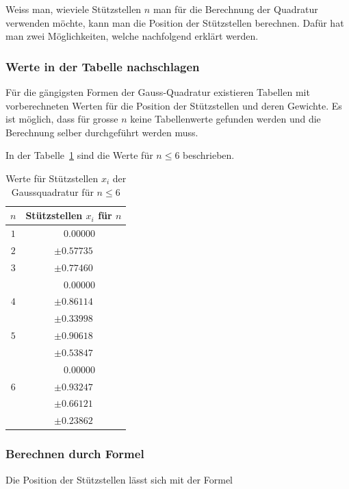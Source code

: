 Weiss man, wieviele Stützstellen $n$ man für die Berechnung der Quadratur verwenden möchte,
kann man die Position der Stützstellen berechnen. 
Dafür hat man zwei Möglichkeiten, welche nachfolgend erklärt werden.

\newpage

\subsubsection{Werte in der Tabelle nachschlagen}
Für die gängigsten Formen der Gauss-Quadratur existieren Tabellen mit vorberechneten Werten für die
Position der Stützstellen und deren Gewichte. 
Es ist möglich, dass für grosse $n$ keine Tabellenwerte gefunden werden und die Berechnung 
selber durchgeführt werden muss.

In der Tabelle~\ref{buch:table:gaussabscissenwerte} sind die Werte für $n \leq 6$ beschrieben.

\begin{table}[h!]
    \centering
    \begin{tabular}{|c|c|}
        \hline
        $n$ & Stützstellen $x_{i}$ für $n$ \\
        \hline
        $1$ & $ \phantom{-} 0.00000 $ \\
        \hline
        $2$ & $ \pm 0.57735 $ \\
        \hline
        $3$ & $ \pm 0.77460 $ \\
            & $ \phantom{-} 0.00000 $ \\
        \hline
        $4$ & $ \pm 0.86114 $ \\
            & $ \pm 0.33998 $ \\
        \hline
        $5$ & $ \pm 0.90618 $ \\
            & $ \pm 0.53847 $ \\
            & $ \phantom{-} 0.00000 $ \\
        \hline
        $6$ & $ \pm 0.93247 $ \\
            & $ \pm 0.66121 $ \\
            & $ \pm 0.23862 $ \\
        \hline
    \end{tabular}
    \caption{Werte für Stützstellen $x_{i}$ der Gaussquadratur für $n \leq 6$
    \label{buch:table:gaussabscissenwerte}}    
\end{table}


\newpage

\subsubsection{Berechnen durch Formel}
Die Position der Stützstellen lässt sich mit der Formel

